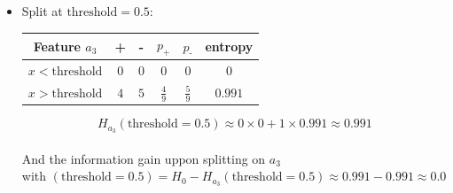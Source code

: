 \documentclass[a4paper, 10pt]{article}
\begin{document}
\begin{itemize}[label=$\square$]
    \item Split at $\text{threshold}=0.5$:
    \begin{center}
        \begin{tabular}{ |c|c|c|c|c|c| }
            \hline
            Feature $a_3$           & +      & -     & $p_\text{+}$ & $p_\text{-}$  & entropy\\
            \hline
            $x<\text{threshold}$    & $0$    & $0$   & $0$          & $0$           & $0$\\
            \hline
            $x>\text{threshold}$    & $4$    & $5$   & $\frac{4}{9}$ & $\frac{5}{9} $ & $0.991$\\
            \hline
        \end{tabular}
    \end{center}
    $$
    H_{a_3}(\text{threshold}=0.5) \approx 0\times0 + 1\times0.991 \approx 0.991
    $$
    \\
    And the information gain uppon splitting on $a_3$ \\with $(\text{threshold}=0.5)= H_0 -H_{a_3}(\text{threshold}=0.5) \approx 0.991 - 0.991 \approx 0.0$


\end{itemize}
\end{document}
